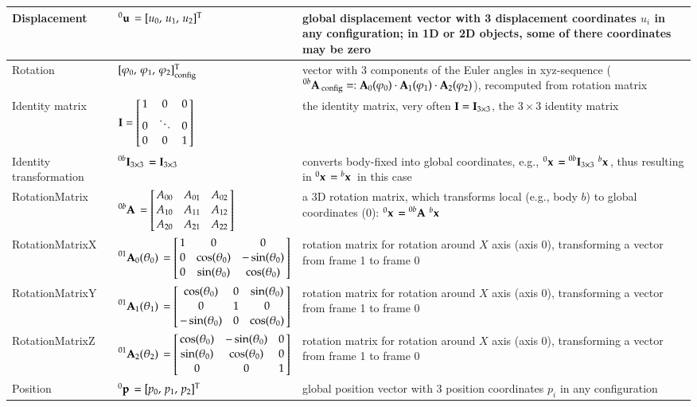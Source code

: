 \begin{center}
\begin{longtable}{| p{5cm} | p{5cm} | p{6cm} |}
    Displacement & $\prescript{0}{}{\mathbf{u}}\, = [u_0,\, u_1,\, u_2]^\mathrm{T}$ & global displacement vector with 3 displacement coordinates $u_i$ in any configuration; in 1D or 2D objects, some of there coordinates may be zero\\ \hline
Rotation & $[\varphi_0,\,\varphi_1,\,\varphi_2]^\mathrm{T}_\mathrm{config}$ & vector with 3 components of the Euler angles in xyz-sequence ($\prescript{0b}{}{\mathbf{A}}\,_\mathrm{config}=:\mathbf{A}_0(\varphi_0) \cdot \mathbf{A}_1(\varphi_1) \cdot \mathbf{A}_2(\varphi_2)$), recomputed from rotation matrix\\ \hline
    Identity matrix & $\Im = \mr{1}{0}{0} {0}{\ddots}{0} {0}{0}{1}$ & the identity matrix, very often $\mathbf{I} = \mathbf{I}_{3 \times 3}$, the $3 \times 3$ identity matrix \\ \hline
    Identity transformation & $\prescript{0b}{}{\mathbf{I}_{3 \times 3}}\, = \mathbf{I}_{3 \times 3}$ & converts body-fixed into global coordinates, e.g., $\prescript{0}{}{\mathbf{x}}\, = \prescript{0b}{}{\mathbf{I}_{3 \times 3}}\, \prescript{b}{}{\mathbf{x}}\,$, thus resulting in $\prescript{0}{}{\mathbf{x}}\, = \prescript{b}{}{\mathbf{x}}\,$ in this case\\ \hline
    RotationMatrix & $\LU{0b}{\Rot} = \mr{A_{00}}{A_{01}}{A_{02}} {A_{10}}{A_{11}}{A_{12}} {A_{20}}{A_{21}}{A_{22}}$ & a 3D rotation matrix, which transforms local (e.g., body $b$) to global coordinates (0): $\prescript{0}{}{\mathbf{x}}\, = \prescript{0b}{}{\mathbf{A}}\, \prescript{b}{}{\mathbf{x}}\,$\\ \hline
    RotationMatrixX & $\LU{01}{\Rot_0(\theta_0)} = 
		\mr{1}{0}{0} {0}{\cos(\theta_0)}{-\sin(\theta_0)} {0}{\sin(\theta_0)}{\cos(\theta_0)}$ & rotation matrix for rotation around $X$ axis (axis 0), transforming a vector from frame 1 to frame 0\\ \hline    
		RotationMatrixY & $\LU{01}{\Rot_1(\theta_1)} = 
		\mr{\cos(\theta_0)}{0}{\sin(\theta_0)} {0}{1}{0} {-\sin(\theta_0)}{0}{\cos(\theta_0)}$ & rotation matrix for rotation around $X$ axis (axis 0), transforming a vector from frame 1 to frame 0\\ \hline    %
    RotationMatrixZ & $\LU{01}{\Rot_2(\theta_2)} = 
		\mr{\cos(\theta_0)}{-\sin(\theta_0)}{0} {\sin(\theta_0)}{\cos(\theta_0)}{0} {0}{0}{1}$ & rotation matrix for rotation around $X$ axis (axis 0), transforming a vector from frame 1 to frame 0\\ \hline    
		Position & $\prescript{0}{}{\mathbf{p}}\, = [p_0,\, p_1,\, p_2]^\mathrm{T}$ & global position vector with 3 position coordinates $p_i$ in any configuration\\ \hline

\end{longtable}
\end{center}
